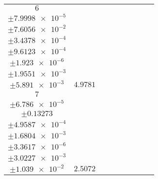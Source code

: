 \documentclass[8pt]{article}
\begin{document}
\begin{longtable}[l]{c c c c c c c c c}
$\num{6}$ & \begin{tabular}[c]{@{}c@{}}$\num{6.3748e-2}$ \\ $\pm\num{7.9998e-5}$\end{tabular} & \begin{tabular}[c]{@{}c@{}}$\num{0.31076}$ \\ $\pm\num{7.6056e-2}$\end{tabular} & \begin{tabular}[c]{@{}c@{}}$\num{7.3997}$ \\ $\pm\num{3.4378e-4}$\end{tabular} & \begin{tabular}[c]{@{}c@{}}$\num{1.8652e+3}$ \\ $\pm\num{9.6123e-4}$\end{tabular} & \begin{tabular}[c]{@{}c@{}}$\num{3.7314}$ \\ $\pm\num{1.923e-6}$\end{tabular} & \begin{tabular}[c]{@{}c@{}}$\num{1.4363}$ \\ $\pm\num{1.9551e-3}$\end{tabular} & \begin{tabular}[c]{@{}c@{}}$\num{4.3982}$ \\ $\pm\num{5.891e-3}$\end{tabular} & $\num{4.9781}$\\
$\num{7}$ & \begin{tabular}[c]{@{}c@{}}$\num{2.9836e-2}$ \\ $\pm\num{6.786e-5}$\end{tabular} & \begin{tabular}[c]{@{}c@{}}$\num{0.2655}$ \\ $\pm\num{0.13273}$\end{tabular} & \begin{tabular}[c]{@{}c@{}}$\num{9.0996}$ \\ $\pm\num{4.9587e-4}$\end{tabular} & \begin{tabular}[c]{@{}c@{}}$\num{1.8669e+3}$ \\ $\pm\num{1.6804e-3}$\end{tabular} & \begin{tabular}[c]{@{}c@{}}$\num{3.7348}$ \\ $\pm\num{3.3617e-6}$\end{tabular} & \begin{tabular}[c]{@{}c@{}}$\num{1.1435}$ \\ $\pm\num{3.0227e-3}$\end{tabular} & \begin{tabular}[c]{@{}c@{}}$\num{4.1858}$ \\ $\pm\num{1.039e-2}$\end{tabular} & $\num{2.5072}$\\

\end{longtable}
\end{document}
